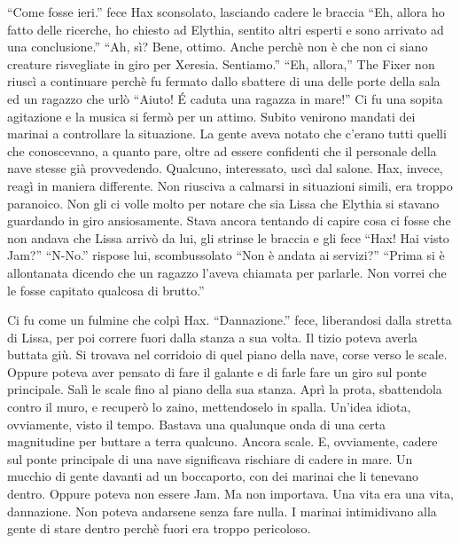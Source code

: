     ``Come fosse ieri.'' fece Hax sconsolato, lasciando cadere le braccia
    ``Eh, allora ho fatto delle ricerche, ho chiesto ad Elythia, sentito
    altri esperti e sono arrivato ad una conclusione.'' ``Ah, sì? Bene,
    ottimo. Anche perchè non è che non ci siano creature risvegliate in
    giro per Xeresia. Sentiamo.'' ``Eh, allora,'' The Fixer non riuscì a
    continuare perchè fu fermato dallo sbattere di una delle porte della
    sala ed un ragazzo che urlò ``Aiuto! \'E caduta una ragazza in mare!'' Ci fu una sopita
    agitazione e la musica si fermò per un attimo. Subito venirono mandati
    dei marinai a controllare la situazione. La gente aveva notato che c'erano tutti quelli che
    conoscevano, a quanto pare, oltre ad essere confidenti che il personale
    della nave stesse già provvedendo. Qualcuno, interessato, uscì dal
    salone. Hax, invece, reagì in maniera
    differente. Non riusciva a calmarsi in situazioni simili, era troppo
    paranoico. Non gli ci volle molto per notare che sia Lissa che Elythia
    si stavano guardando in giro ansiosamente. Stava ancora tentando di
    capire cosa ci fosse che non andava che Lissa arrivò da lui, gli
    strinse le braccia e gli fece ``Hax! Hai visto Jam?'' ``N-No.'' rispose
    lui, scombussolato ``Non è andata ai servizi?'' ``Prima si è
    allontanata dicendo che un ragazzo l'aveva chiamata per parlarle. Non
    vorrei che le fosse capitato qualcosa di brutto.''

    Ci fu come un fulmine che colpì Hax. ``Dannazione.'' fece, liberandosi
    dalla stretta di Lissa, per poi correre fuori dalla stanza a sua volta. Il
    tizio poteva averla buttata giù. Si trovava nel corridoio di quel piano
    della nave, corse verso le scale. Oppure poteva aver pensato di fare il
    galante e di farle fare un giro sul ponte principale. Salì le scale
    fino al piano della sua stanza. Aprì la prota, sbattendola contro il
    muro, e recuperò lo zaino, mettendoselo in spalla. Un'idea idiota, ovviamente, visto il tempo.
    Bastava una qualunque onda di una certa magnitudine per buttare a terra
    qualcuno. Ancora scale. E, ovviamente, cadere sul ponte principale di
    una nave significava rischiare di cadere in mare. Un mucchio di gente
    davanti ad un boccaporto, con dei marinai che li tenevano dentro.
    Oppure poteva non essere Jam. Ma non importava. Una vita era una vita,
    dannazione. Non poteva andarsene senza fare nulla. I marinai
    intimidivano alla gente di stare dentro perchè fuori era troppo
    pericoloso.

